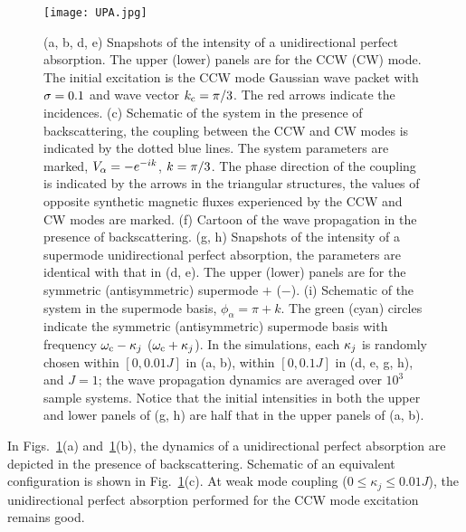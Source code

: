 \documentclass[prl,showpacs,superscriptaddress,twocolumn]{revtex4-1}
\begin{document}
\begin{widetext}
\begin{figure}[thb]
\centering\texttt{[image: UPA.jpg]}
\caption{(a, b, d, e) Snapshots of the intensity of a unidirectional perfect
absorption. The upper (lower) panels are for the CCW (CW) mode. The initial
excitation is the CCW mode Gaussian wave packet with $\protect\sigma =0.1$ and wave vector $k_{\mathrm{c}}=\protect\pi /3$. The red arrows indicate the
incidences. (c) Schematic of the system in the presence of backscattering,
the coupling between the CCW and CW modes is indicated by the dotted blue
lines. The system parameters are marked, $V_{\protect\alpha }=-e^{-i k}$, $k=\protect\pi/3$. The phase direction of the coupling is indicated by the
arrows in the triangular structures, the values of opposite synthetic magnetic fluxes experienced by the
CCW and CW modes are marked. (f) Cartoon of the wave propagation in the
presence of backscattering. (g, h) Snapshots of the intensity of a supermode unidirectional perfect
absorption, the parameters are identical with that in (d, e).
The upper (lower) panels are for the symmetric (antisymmetric) supermode $+$ ($-$). (i) Schematic of the system in the supermode basis, $\phi_{\alpha}=\pi+k$. The green (cyan) circles indicate the symmetric (antisymmetric) supermode basis with frequency $\omega_{\rm{c}}-\kappa_{j}$  ($\omega_{\rm{c}}+\kappa_{j}$).
In the simulations, each $\protect\kappa_j$
is randomly chosen within $[0,0.01J]$ in (a, b), within $[0,0.1J]$ in (d, e, g, h), and $J=1$; the wave propagation dynamics are averaged over $10^3$ sample systems. Notice that the initial intensities in both the upper and lower panels of (g, h) are half that in the upper panels of (a, b).
} \label{figUPABS}
\end{figure}

In Figs.~\ref{figUPABS}(a) and~\ref{figUPABS}(b), the
dynamics of a unidirectional perfect absorption are depicted in the presence
of backscattering. Schematic of an equivalent configuration is shown in
Fig.~\ref{figUPABS}(c). At weak mode coupling ($0\leqslant
\kappa _{j}\leqslant 0.01J$), the unidirectional perfect absorption
performed for the CCW mode excitation remains good.


\end{widetext}
\end{document}
